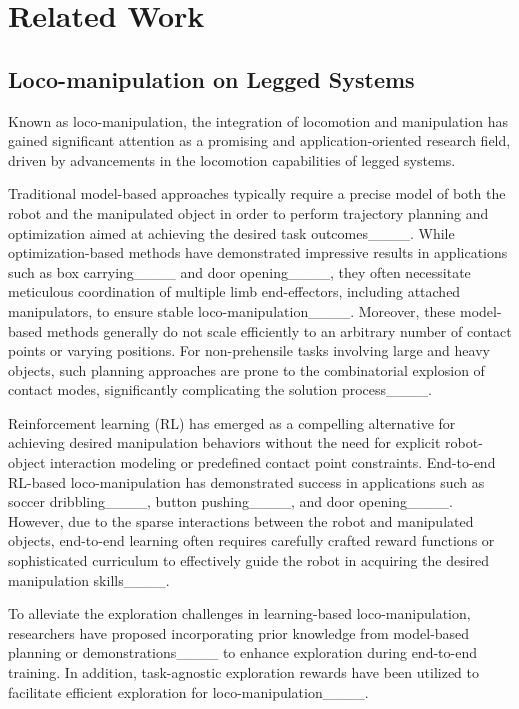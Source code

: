 \section{Related Work}
\subsection{Loco-manipulation on Legged Systems}
 Known as loco-manipulation, the integration of locomotion and manipulation has gained significant attention as a promising and application-oriented research field, driven by advancements in the locomotion capabilities of legged systems.

Traditional model-based approaches typically require a precise model of both the robot and the manipulated object in order to perform trajectory planning and optimization aimed at achieving the desired task outcomes____.
While optimization-based methods have demonstrated impressive results in applications such as box carrying____ and door opening____, they often necessitate meticulous coordination of multiple limb end-effectors, including attached manipulators, to ensure stable loco-manipulation____.
Moreover, these model-based methods generally do not scale efficiently to an arbitrary number of contact points or varying positions.
For non-prehensile tasks involving large and heavy objects, such planning approaches are prone to the combinatorial explosion of contact modes, significantly complicating the solution process____.

Reinforcement learning (RL) has emerged as a compelling alternative for achieving desired manipulation behaviors without the need for explicit robot-object interaction modeling or predefined contact point constraints.
End-to-end RL-based loco-manipulation has demonstrated success in applications such as soccer dribbling____, button pushing____, and door opening____.
However, due to the sparse interactions between the robot and manipulated objects, end-to-end learning often requires carefully crafted reward functions or sophisticated curriculum to effectively guide the robot in acquiring the desired manipulation skills____.

To alleviate the exploration challenges in learning-based loco-manipulation, researchers have proposed incorporating prior knowledge from model-based planning or demonstrations____ to enhance exploration during end-to-end training. 
In addition, task-agnostic exploration rewards have been utilized to facilitate efficient exploration for loco-manipulation____.

